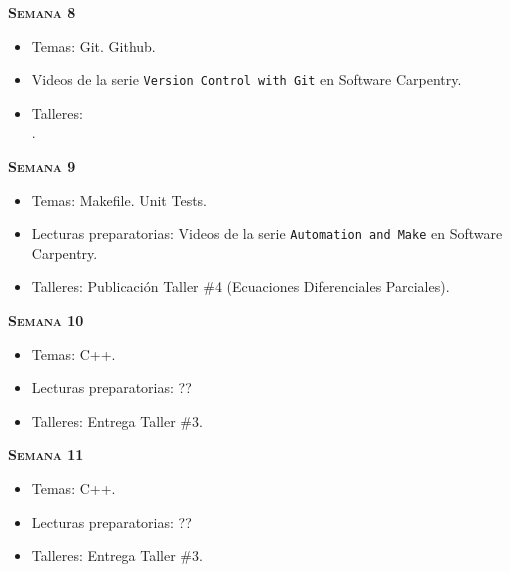 \documentclass[letterpaper,10pt,onecolumn]{article}
\begin{document}
\noindent\textbf{\textsc{Semana 8}}\\[-0.5cm]
\begin{itemize}
\item Temas: Git. Github. \\[-0.6cm]
\item Videos de la serie \texttt{Version Control with Git} en
  Software Carpentry.\\[-0.6cm]   
\item Talleres:\\[-0.6cm]. 
\end{itemize}

\noindent\textbf{\textsc{Semana 9}}\\[-0.5cm]
\begin{itemize}
\item Temas: Makefile. Unit Tests. \\[-0.6cm]
\item Lecturas preparatorias: Videos de la serie \texttt{Automation
  and Make} en Software Carpentry. \\[-0.6cm]
\item Talleres: Publicaci\'on Taller \#4 (Ecuaciones Diferenciales
  Parciales). \\[-0.6cm] 
\end{itemize}



\noindent\textbf{\textsc{Semana 10}}\\[-0.5cm]
\begin{itemize}
\item Temas: C++. \\[-0.6cm]
\item Lecturas preparatorias: ??\\[-0.6cm]
\item Talleres: Entrega Taller \#3.\\[-0.6cm]
\end{itemize}


\noindent\textbf{\textsc{Semana 11}}\\[-0.5cm]
\begin{itemize}
\item Temas: C++. \\[-0.6cm]
\item Lecturas preparatorias: ??\\[-0.6cm]
\item Talleres: Entrega Taller \#3.\\[-0.6cm]
\end{itemize}
\end{document}
